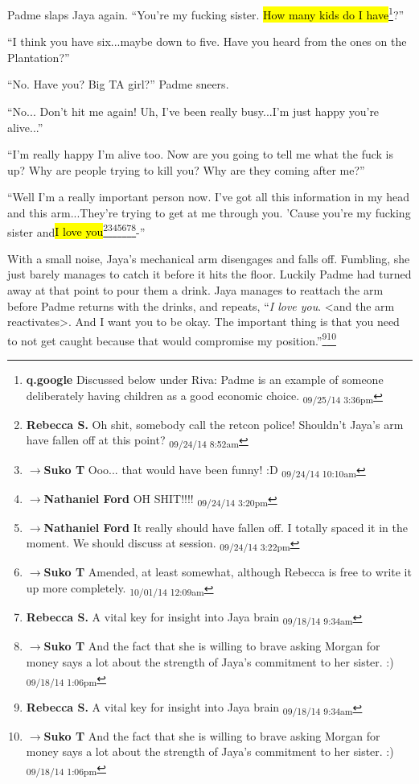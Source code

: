 Padme slaps Jaya again.  ``You're my fucking sister.  \hl{How many kids do I have}\footnote{\textbf{q.google }Discussed below under Riva: Padme is an example of someone deliberately having children as a good economic choice. \textsubscript{09/25/14 3:36pm}}?''

``I think you have six...maybe down to five.  Have you heard from the ones on the Plantation?''

``No.  Have you?  Big TA girl?'' Padme sneers.

``No... Don't hit me again!  Uh, I've been really busy...I'm just happy you're alive...''

``I'm really happy I'm alive too.  Now are you going to tell me what the fuck is up? Why are people trying to kill you?  Why are they coming after me?''

``Well I'm a really important person now.  I've got all this information in my head and this arm...They're trying to get at me through you.  'Cause you're my fucking sister and\hl{I love you}\footnote{\textbf{Rebecca S. }Oh shit, somebody call the retcon police! Shouldn't Jaya's arm have fallen off at this point? \textsubscript{09/24/14 8:52am}}\footnote{$\rightarrow$\textbf{Suko T }Ooo... that would have been funny! :D \textsubscript{09/24/14 10:10am}}\footnote{$\rightarrow$\textbf{Nathaniel Ford }OH SHIT!!!! \textsubscript{09/24/14 3:20pm}}\footnote{$\rightarrow$\textbf{Nathaniel Ford }It really should have fallen off. I totally spaced it in the moment. We should discuss at session. \textsubscript{09/24/14 3:22pm}}\footnote{$\rightarrow$\textbf{Suko T }Amended, at least somewhat, although Rebecca is free to write it up more completely. \textsubscript{10/01/14 12:09am}}\footnote{\textbf{Rebecca S. }A vital key for insight into Jaya brain \textsubscript{09/18/14 9:34am}}\footnote{$\rightarrow$\textbf{Suko T }And the fact that she is willing to brave asking Morgan for money says a lot about the strength of Jaya's commitment to her sister. :) \textsubscript{09/18/14 1:06pm}}-''

With a small noise, Jaya's mechanical arm disengages and falls off.  Fumbling, she just barely manages to catch it before it hits the floor.  Luckily Padme had turned away at that point to pour them a drink.  Jaya manages to reattach the arm before Padme returns with the drinks, and repeats,  ``\textit{I love you}. \textless and the arm reactivates\textgreater .  And I want you to be okay.  The important thing is that you need to not get caught because that would compromise my position.''\footnote{\textbf{Rebecca S. }A vital key for insight into Jaya brain \textsubscript{09/18/14 9:34am}}\footnote{$\rightarrow$\textbf{Suko T }And the fact that she is willing to brave asking Morgan for money says a lot about the strength of Jaya's commitment to her sister. :) \textsubscript{09/18/14 1:06pm}}

